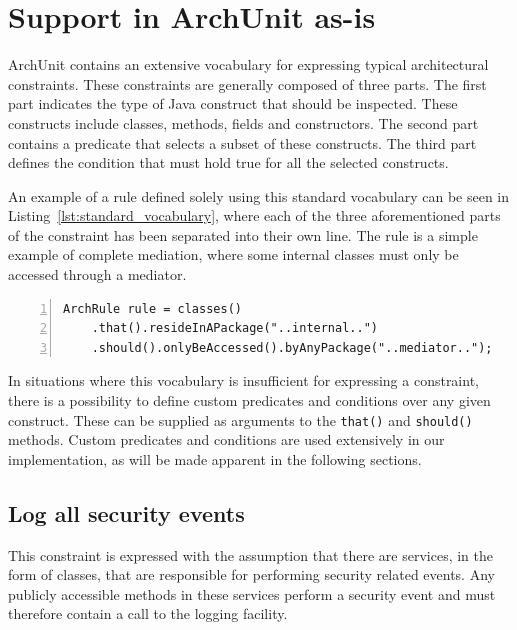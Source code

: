 \section{Support in ArchUnit as-is}\label{sec:as-is}

ArchUnit contains an extensive vocabulary for expressing typical architectural constraints. These constraints are generally composed of three parts. The first part indicates the type of Java construct that should be inspected. These constructs include classes, methods, fields and constructors. The second part contains a predicate that selects a subset of these constructs. The third part defines the condition that must hold true for all the selected constructs.

An example of a rule defined solely using this standard vocabulary can be seen in Listing~\ref{lst:standard_vocabulary}, where each of the three aforementioned parts of the constraint has been separated into their own line. The rule is a simple example of complete mediation, where some internal classes must only be accessed through a mediator.

\begin{minipage}{\linewidth}
\begin{lstlisting}[caption={Example of a rule that is expressed with the standard vocabulary.}, captionpos=b, label=lst:standard_vocabulary, numbers=left]
ArchRule rule = classes()
    .that().resideInAPackage("..internal..")
    .should().onlyBeAccessed().byAnyPackage("..mediator..");
\end{lstlisting}
\end{minipage}

In situations where this vocabulary is insufficient for expressing a constraint, there is a possibility to define custom predicates and conditions over any given construct. These can be supplied as arguments to the \texttt{that()} and \texttt{should()} methods. Custom predicates and conditions are used extensively in our implementation, as will be made apparent in the following sections.

\subsection{Log all security events}
This constraint is expressed with the assumption that there are services, in the form of classes, that are responsible for performing security related events. Any publicly accessible methods in these services perform a security event and must therefore contain a call to the logging facility.

